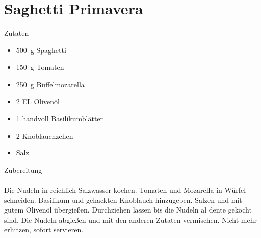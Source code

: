 \section*{Saghetti Primavera}
\ihead{}\ohead{}
\cfoot{}
{\Large Zutaten}
\begin{multicols}{2}
\begin{itemize}
    \item \SI{500}{g} Spaghetti
    \item \SI{150}{g} Tomaten
    \item \SI{250}{g} Büffelmozarella
    \item \num{2} EL Olivenöl
    \item \num{1} handvoll Basilikumblätter
    \item \num{2} Knoblauchzehen
    \item Salz
\end{itemize}
\end{multicols}
\noindent
{\Large Zubereitung}\\
\\
Die Nudeln in reichlich Salzwasser kochen.
Tomaten und Mozarella in Würfel schneiden. 
Basilikum und gehackten Knoblauch hinzugeben. 
Salzen und mit gutem Olivenöl übergießen. 
Durchziehen lassen bis die Nudeln al dente gekocht sind. 
Die Nudeln abgießen und mit den anderen Zutaten vermischen. 
Nicht mehr erhitzen, sofort servieren. 
